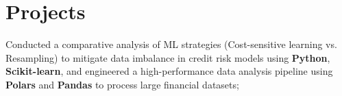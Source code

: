 \section{Projects}
\resumeSubHeadingListStart
{}
{Conducted a comparative analysis of ML strategies (Cost-sensitive learning vs. Resampling) to mitigate data imbalance in credit risk models using \textbf{Python}, \textbf{Scikit-learn}, and engineered a high-performance data analysis pipeline using \textbf{Polars} and \textbf{Pandas} to process large financial datasets;}
\resumeSubHeadingListEnd
